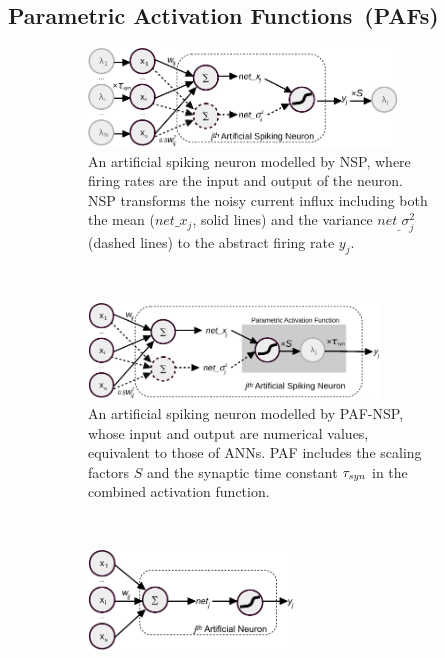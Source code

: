 	\subsection{Parametric Activation Functions~(PAFs)}
	\label{subsec:PAF}
	\begin{figure}[tbh!]
		\centering
		\begin{subfigure}[t]{\textwidth}
			\centering
			\includegraphics[width=0.9\textwidth]{pics_iconip/neuron_o.pdf}
			\bigskip
			\caption{An artificial spiking neuron modelled by NSP, where firing rates are the input and output of the neuron. NSP transforms the noisy current influx including both the mean ($net\_x_{j}$, solid lines) and the variance $net_\_\sigma^2_j$ (dashed lines) to the abstract firing rate $y_j$.}
		\end{subfigure}\\\bigskip\bigskip
		\begin{subfigure}[t]{\textwidth}
			\centering
			\includegraphics[width=0.85\textwidth]{pics_iconip/neuron_PAF.pdf}
			\bigskip
			\caption{An artificial spiking neuron modelled by PAF-NSP, whose input and output are numerical values, equivalent to those of ANNs. PAF includes the scaling factors $S$ and the synaptic time constant $\tau_{\textit{\textrm{syn}}}$ in the combined activation function.}
		\end{subfigure}\\\bigskip\bigskip
		\begin{subfigure}[t]{\textwidth}
			\centering
			\includegraphics[width=0.6\textwidth]{pics_iconip/neuron.pdf}

\end{subfigure}
\end{figure}
